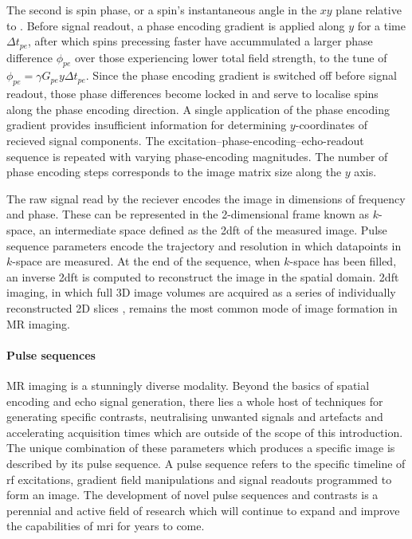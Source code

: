 The second is spin phase, or a spin's instantaneous angle in the $xy$ plane relative to .
Before signal readout, a phase encoding gradient is applied along $y$ for a time $\Delta t_{pe}$, after which spins precessing faster have accummulated a larger phase difference $\phi_{pe}$ over those experiencing lower total field strength, to the tune of $\phi_{pe}=\gamma G_{pe}y \Delta t_{pe}$.
Since the phase encoding gradient is switched off before signal readout, those phase differences become locked in and serve to localise spins along the phase encoding direction.
A single application of the phase encoding gradient provides insufficient information for determining $y$-coordinates of recieved signal components.
The excitation--phase-encoding--echo-readout sequence is repeated with varying phase-encoding magnitudes.
The number of phase encoding steps corresponds to the image matrix size along the $y$ axis.

The raw signal read by the reciever encodes the image in dimensions of frequency and phase.
These can be represented in the 2-dimensional frame known as $k$-space, an intermediate space defined as the \gls{2dft} of the measured image.
Pulse sequence parameters encode the trajectory and resolution in which datapoints in $k$-space are measured.
At the end of the sequence, when $k$-space has been filled, an inverse \gls{2dft} is computed to reconstruct the image in the spatial domain.
\Gls{2dft} imaging, in which full 3D image volumes are acquired as a series of individually reconstructed 2D slices , remains the most common  mode of image formation in MR imaging.

\paragraph*{Pulse sequences}

MR imaging is a stunningly diverse modality.
Beyond the basics of spatial encoding and echo signal generation, there lies a whole host of techniques for generating specific contrasts, neutralising unwanted signals and artefacts and accelerating acquisition times which are outside of the scope of this introduction.
The unique combination of these  parameters which produces a specific image is described by its pulse sequence.
A pulse sequence refers to the specific timeline of \gls{rf} excitations, gradient field manipulations and signal readouts programmed to form an image.
The development of novel pulse sequences and contrasts is a perennial and active field of research which will continue to expand and improve the capabilities of \gls{mri} for years to come.

